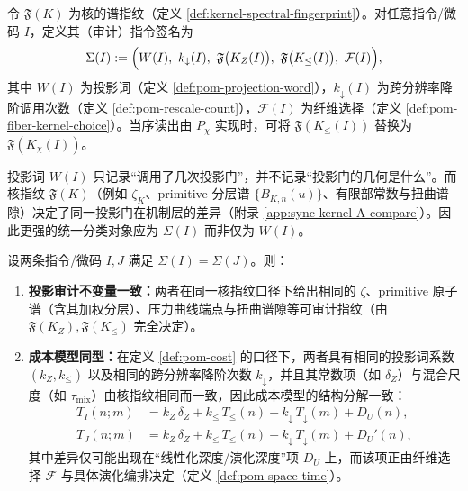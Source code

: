 \begin{definition}\label{def:pom-instruction-signature}
令 $\mathfrak{F}(K)$ 为核的谱指纹（定义 \ref{def:kernel-spectral-fingerprint}）。对任意指令/微码 $I$，定义其（审计）指令签名为
$$
\Sigma(I):=\Bigl(W(I),\ k_{\downarrow}(I),\ \mathfrak{F}\bigl(K_Z(I)\bigr),\ \mathfrak{F}\bigl(K_{\le}(I)\bigr),\ \mathcal{F}(I)\Bigr),
$$
其中 $W(I)$ 为投影词（定义 \ref{def:pom-projection-word}），$k_{\downarrow}(I)$ 为跨分辨率降阶调用次数（定义 \ref{def:pom-rescale-count}），$\mathcal{F}(I)$ 为纤维选择（定义 \ref{def:pom-fiber-kernel-choice}）。当序读出由 $P_\chi$ 实现时，可将 $\mathfrak{F}(K_{\le}(I))$ 替换为 $\mathfrak{F}(K_{\chi}(I))$。
\end{definition}

\begin{remark}\label{rem:pom-signature-why}
投影词 $W(I)$ 只记录“调用了几次投影门”，并不记录“投影门的几何是什么”。而核指纹 $\mathfrak{F}(K)$（例如 $\zeta_K$、primitive 分层谱 $\{B_{K,n}(u)\}$、有限部常数与扭曲谱隙）决定了同一投影门在机制层的差异（附录 \ref{app:sync-kernel-A-compare}）。因此更强的统一分类对象应为 $\Sigma(I)$ 而非仅为 $W(I)$。
\end{remark}

\begin{proposition}\label{prop:pom-signature-audit}
设两条指令/微码 $I,J$ 满足 $\Sigma(I)=\Sigma(J)$。则：
\begin{enumerate}
  \item \textbf{投影审计不变量一致：}两者在同一核指纹口径下给出相同的 $\zeta$、primitive 原子谱（含其加权分层）、压力曲线端点与扭曲谱隙等可审计指纹（由 $\mathfrak{F}(K_Z),\mathfrak{F}(K_{\le})$ 完全决定）。
  \item \textbf{成本模型同型：}在定义 \ref{def:pom-cost} 的口径下，两者具有相同的投影词系数 $(k_Z,k_{\le})$ 以及相同的跨分辨率降阶次数 $k_{\downarrow}$，并且其常数项（如 $\delta_Z$）与混合尺度（如 $\tau_{\mathrm{mix}}$）由核指纹相同而一致，因此成本模型的结构分解一致：
  $$
  \begin{aligned}
  T_I(n;m)&=k_Z\,\delta_Z+k_{\le}\,T_{\le}(n)+k_{\downarrow}\,T_{\downarrow}(m)+D_U(n),\\
  T_J(n;m)&=k_Z\,\delta_Z+k_{\le}\,T_{\le}(n)+k_{\downarrow}\,T_{\downarrow}(m)+D_U'(n),
  \end{aligned}
  $$
  其中差异仅可能出现在“线性化深度/演化深度”项 $D_U$ 上，而该项正由纤维选择 $\mathcal{F}$ 与具体演化编排决定（定义 \ref{def:pom-space-time}）。
\end{enumerate}
\end{proposition}

